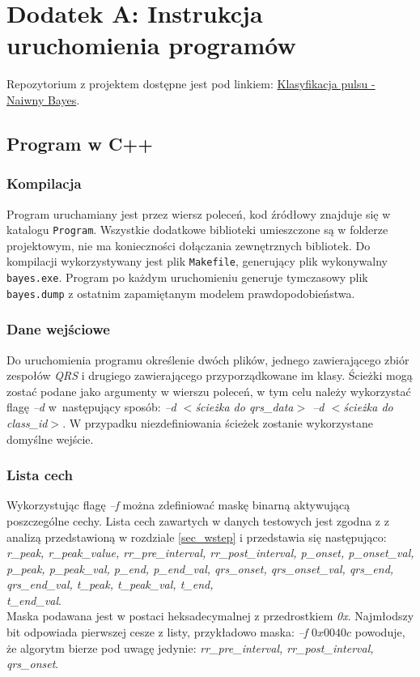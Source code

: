 \section{Dodatek A: Instrukcja uruchomienia programów}
\label{dodatekA}

Repozytorium z projektem dostępne jest pod linkiem: \href{https://github.com/kamilfocus/ESDMiT-Naive-Bayes}{Klasyfikacja pulsu - Naiwny Bayes}. 

\subsection{Program w C++}
\label{subsec_cpp_instr}

\subsubsection{Kompilacja}
Program uruchamiany jest przez wiersz poleceń, kod źródłowy znajduje się w katalogu \texttt{Program}. Wszystkie dodatkowe biblioteki umieszczone są w folderze projektowym, nie ma konieczności dołączania zewnętrznych bibliotek. Do kompilacji wykorzystywany jest plik \texttt{Makefile}, generujący plik wykonywalny \texttt{bayes.exe}. Program po każdym uruchomieniu generuje tymczasowy plik \texttt{bayes.dump} z ostatnim zapamiętanym modelem prawdopodobieństwa. 

\subsubsection{Dane wejściowe}
Do uruchomienia programu określenie dwóch plików, jednego zawierającego zbiór zespołów \textit{QRS} i drugiego zawierającego przyporządkowane im klasy. Ścieżki mogą zostać podane jako argumenty w wierszu poleceń, w tym celu należy wykorzystać flagę \textit{--d} w~następujący sposób: \textit{--d $<$ścieżka do qrs\_data$>$ --d $<$ścieżka do class\_id$>$}. W przypadku niezdefiniowania ścieżek zostanie wykorzystane domyślne wejście.

\subsubsection{Lista cech}
Wykorzystując flagę \textit{--f} można zdefiniować maskę binarną aktywującą poszczególne cechy. Lista cech zawartych w danych testowych jest zgodna z z analizą przedstawioną w rozdziale \ref{sec_wstep} i przedstawia się następująco:\\
\textit{r\_peak, r\_peak\_value, rr\_pre\_interval, rr\_post\_interval, 
p\_onset, p\_onset\_val, p\_peak, p\_peak\_val, p\_end, p\_end\_val, 
qrs\_onset, qrs\_onset\_val, qrs\_end, qrs\_end\_val, t\_peak, t\_peak\_val, 
t\_end, \\t\_end\_val}.\\
Maska podawana jest w postaci heksadecymalnej z przedrostkiem \textit{0x}. Najmłodszy bit odpowiada pierwszej cesze z listy, przykładowo maska: \textit{--f $0x0040c$} powoduje, że algorytm bierze pod uwagę jedynie: \textit{rr\_pre\_interval, rr\_post\_interval, qrs\_onset}.

